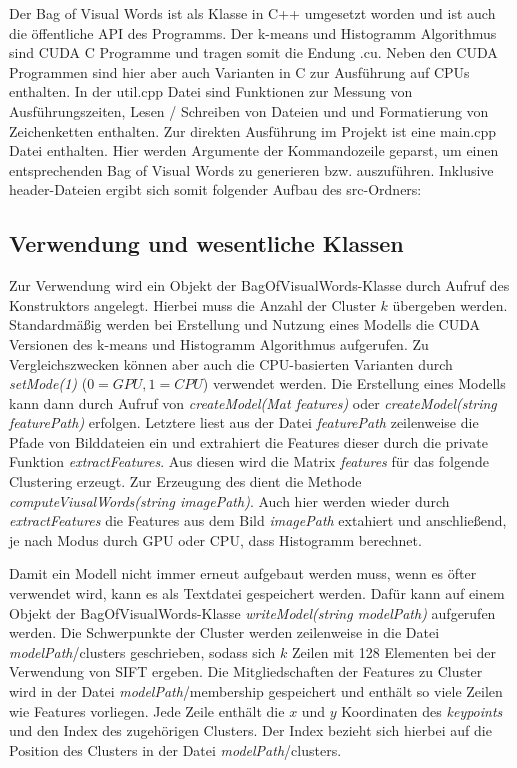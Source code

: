 Der Bag of Visual Words ist als Klasse in C++ umgesetzt worden und ist auch die öffentliche API des Programms. Der k-means und Histogramm Algorithmus sind CUDA C Programme und tragen somit die Endung .cu. Neben den CUDA Programmen sind hier aber auch Varianten in C zur Ausführung auf CPUs enthalten. In der util.cpp Datei sind Funktionen zur Messung von Ausführungszeiten, Lesen / Schreiben von Dateien und und Formatierung von Zeichenketten enthalten. Zur direkten Ausführung im Projekt ist eine main.cpp Datei enthalten. Hier werden Argumente der Kommandozeile geparst, um einen entsprechenden Bag of Visual Words zu generieren bzw. auszuführen. Inklusive header-Dateien ergibt sich somit folgender Aufbau des src-Ordners:

\subsection{Verwendung und wesentliche Klassen}

Zur Verwendung wird ein Objekt der BagOfVisualWords-Klasse durch Aufruf des Konstruktors angelegt. Hierbei muss die Anzahl der Cluster $k$ übergeben werden. Standardmäßig werden bei Erstellung und Nutzung eines Modells die CUDA Versionen des k-means und Histogramm Algorithmus aufgerufen. Zu Vergleichszwecken können aber auch die CPU-basierten Varianten durch \textit{setMode(1)} ($0 = GPU, 1 = CPU$) verwendet werden. Die Erstellung eines Modells kann dann durch Aufruf von \textit{createModel(Mat features)} oder \textit{createModel(string featurePath)} erfolgen. Letztere liest aus der Datei \textit{featurePath} zeilenweise die Pfade von Bilddateien ein und extrahiert die Features dieser durch die private Funktion \textit{extractFeatures}. Aus diesen wird die Matrix \textit{features} für das folgende Clustering erzeugt.
Zur Erzeugung des  dient die Methode \textit{computeViusalWords(string imagePath)}. Auch hier werden wieder durch \textit{extractFeatures} die Features aus dem Bild \textit{imagePath} extahiert und anschließend, je nach Modus durch GPU oder CPU, dass Histogramm berechnet. 

 Damit ein Modell nicht immer erneut aufgebaut werden muss, wenn es öfter verwendet wird, kann es als Textdatei gespeichert werden. Dafür kann auf einem Objekt der BagOfVisualWords-Klasse \textit{writeModel(string modelPath)} aufgerufen werden. Die Schwerpunkte der Cluster werden zeilenweise in die Datei \textit{modelPath}/clusters geschrieben, sodass sich $k$ Zeilen mit 128 Elementen bei der Verwendung von SIFT ergeben. Die Mitgliedschaften der Features zu Cluster wird in der Datei \textit{modelPath}/membership gespeichert und enthält so viele Zeilen wie Features vorliegen. Jede Zeile enthält die $x$ und $y$ Koordinaten des \textit{keypoints} und den Index des zugehörigen Clusters. Der Index bezieht sich hierbei auf die Position des Clusters in der Datei \textit{modelPath}/clusters.

